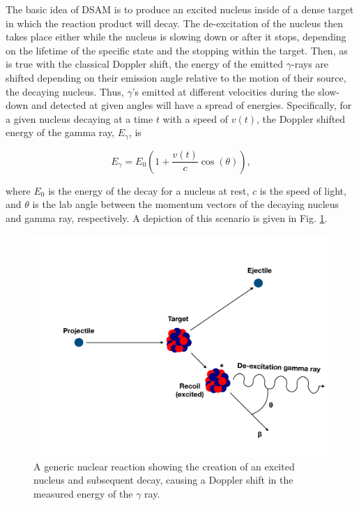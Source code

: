 The basic idea of DSAM is to produce an excited nucleus inside of a dense target in which the reaction product will decay. The de-excitation of the nucleus then takes place either while the nucleus is slowing down or after it stops, depending on the lifetime of the specific state and the stopping within the target. Then, as is true with the classical Doppler shift, the energy of the emitted $\gamma$-rays are shifted depending on their emission angle relative to the motion of their source, the decaying nucleus. Thus, $\gamma$'s emitted at different velocities during the slow-down and detected at given angles will have a spread of energies. Specifically, for a given nucleus decaying at a time $t$ with a speed of $v(t)$, the Doppler shifted energy of the gamma ray, $E_{\gamma}$, is 

\begin{equation}
E_{\gamma} = E_{0} \left(1 + \dfrac{v(t)}{c} \cos (\theta)   \right),
\label{eqn: doppler1}
\end{equation}

\noindent where $E_{0}$ is the energy of the decay for a nucleus at rest, $c$ is the speed of light, and $\theta$ is the lab angle between the momentum vectors of the decaying nucleus and gamma ray, respectively. A depiction of this scenario is given in Fig. \ref{fig: decay}.

\begin{figure}
\includegraphics[width=\linewidth]{figures/decay.pdf}
\caption{A generic nuclear reaction showing the creation of an excited nucleus and subsequent decay, causing a Doppler shift in the measured energy of the $\gamma$ ray.}
\label{fig: decay}
\end{figure}


